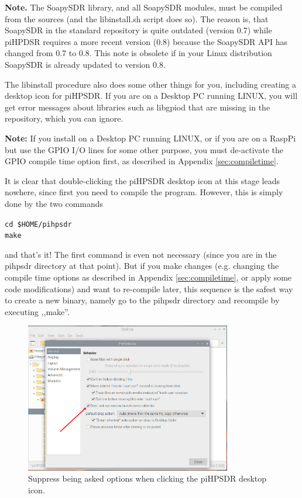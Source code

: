 \documentclass[12pt]{book}
\def\grtt#1{\texttt{\color{magenta}#1}}
\def\pH{pi\-HPSDR\xspace}
\begin{document}
\textbf{Note.} The SoapySDR library, and all SoapySDR modules, must be compiled from the sources
(and the libinstall.sh script does so). The reason is, that SoapySDR in the standard repository
is quite outdated (version 0.7) while piHPDSR requires a more recent version (0.8) because the
SoapySDR API has changed from 0.7 to 0.8. This note is obsolete if in your Linux distribution
SoapySDR is already updated to version 0.8.

The libinstall procedure also does some other things for you, including creating a desktop icon
for \pH. If you are on a Desktop PC running LINUX, you will get error messages about
libraries such as libgpiod that are missing in the repository, which you can ignore.

\textbf{Note:} If you install on a Desktop PC running LINUX, or if you are on a RaspPi but use
the GPIO I/O lines for some other purpose, you must de-activate the GPIO compile time option
first, as described in Appendix \ref{sec:compiletime}.

It is clear that double-clicking the \pH desktop icon at this stage leads nowhere,
since first you need to compile the program.
However,
this is simply done by the two commands

\grtt{cd \$HOME/pihpsdr} \\
\grtt{make}

and that's it! The first command is even not necessary (since you are in the pihpsdr
directory at that point).
But if you make changes (e.g. changing the compile time options as described in
Appendix \ref{sec:compiletime}, or apply some code modifications)
and want to re-compile later, this sequence is the safest way to create a new binary,
namely go to the pihpsdr
directory and recompile by executing ,,make''.

\begin{figure}[ht]
\center
\includegraphics[width=9cm]{piDontAsk.png}
\caption{Suppress being asked options when clicking the \pH desktop icon.}
\label{fig:piDontAsk}
\end{figure}
\end{document}
